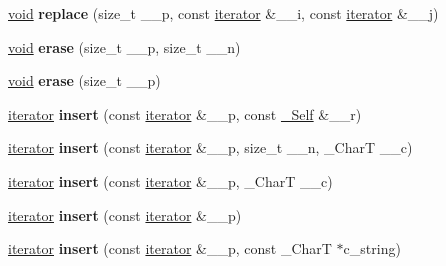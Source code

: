 \begin{DoxyCompactItemize}
\item 
\mbox{\label{classrope_a28653e3d0fb1e6069cc553b4c73e6ade}} 
\hyperlink{interfacevoid}{void} {\bfseries replace} (size\+\_\+t \+\_\+\+\_\+p, const \hyperlink{class___rope__iterator}{iterator} \&\+\_\+\+\_\+i, const \hyperlink{class___rope__iterator}{iterator} \&\+\_\+\+\_\+j)
\item 
\mbox{\label{classrope_acdf88c4be0eb935de206dc9f9f66a90b}} 
\hyperlink{interfacevoid}{void} {\bfseries erase} (size\+\_\+t \+\_\+\+\_\+p, size\+\_\+t \+\_\+\+\_\+n)
\item 
\mbox{\label{classrope_a07ffdfd3697495551e54e1c18f7b9120}} 
\hyperlink{interfacevoid}{void} {\bfseries erase} (size\+\_\+t \+\_\+\+\_\+p)
\item 
\mbox{\label{classrope_a4798d96619d2abde10961549e144175e}} 
\hyperlink{class___rope__iterator}{iterator} {\bfseries insert} (const \hyperlink{class___rope__iterator}{iterator} \&\+\_\+\+\_\+p, const \hyperlink{classrope}{\+\_\+\+Self} \&\+\_\+\+\_\+r)
\item 
\mbox{\label{classrope_ab9a43bcf0a3e8f4f09849b81aa3909b6}} 
\hyperlink{class___rope__iterator}{iterator} {\bfseries insert} (const \hyperlink{class___rope__iterator}{iterator} \&\+\_\+\+\_\+p, size\+\_\+t \+\_\+\+\_\+n, \+\_\+\+CharT \+\_\+\+\_\+c)
\item 
\mbox{\label{classrope_ab5677989df21e2ee265531dc1b612167}} 
\hyperlink{class___rope__iterator}{iterator} {\bfseries insert} (const \hyperlink{class___rope__iterator}{iterator} \&\+\_\+\+\_\+p, \+\_\+\+CharT \+\_\+\+\_\+c)
\item 
\mbox{\label{classrope_a742a3d2510a2b95b669c4866d4f584e8}} 
\hyperlink{class___rope__iterator}{iterator} {\bfseries insert} (const \hyperlink{class___rope__iterator}{iterator} \&\+\_\+\+\_\+p)
\item 
\mbox{\label{classrope_aa91391d4f5c1241a1a9045b1bce13021}} 
\hyperlink{class___rope__iterator}{iterator} {\bfseries insert} (const \hyperlink{class___rope__iterator}{iterator} \&\+\_\+\+\_\+p, const \+\_\+\+CharT $\ast$c\+\_\+string)
\item 

\end{DoxyCompactItemize}
